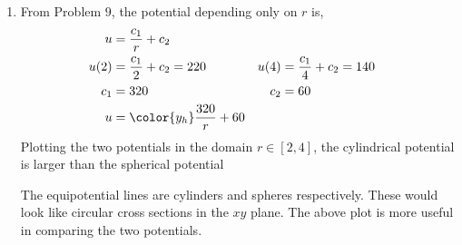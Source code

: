 \begin{enumerate}
    \item From Problem $ 9 $, the potential depending only on $ r $ is,
          \begin{align}
              u    & = \frac{c_1}{r} + c_2              \\
              u(2) & = \frac{c_1}{2} + c_2 = 220      &
              u(4) & = \frac{c_1}{4} + c_2 = 140        \\
              c_1  & = 320                            &
              c_2  & = 60                               \\
              u    & = \color{y_h} \frac{320}{r} + 60
          \end{align}
          Plotting the two potentials in the domain $ r \in [2, 4] $, the cylindrical
          potential is larger than the spherical potential
          \begin{figure}[H]
              \centering
          \end{figure}
          The equipotential lines are cylinders and spheres respectively. These would
          look like circular cross sections in the $ xy $ plane. The above plot is more
          useful in comparing the two potentials.


\end{enumerate}
